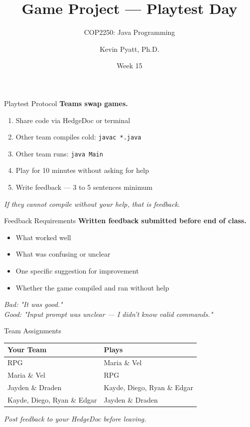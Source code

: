 \documentclass{beamer}
\title[Playtest Day]{Game Project --- Playtest Day}
\subtitle{COP2250: Java Programming}
\author{Kevin Pyatt, Ph.D.}
\institute{State College of Florida \\ Pyatt Labs}
\date{Week 15}
\begin{document}
\begin{frame}
  \titlepage
\end{frame}
\begin{frame}{Playtest Protocol}
\textbf{Teams swap games.}
\vspace{0.3cm}
\begin{enumerate}
  \item Share code via HedgeDoc or terminal
  \item Other team compiles cold: \texttt{javac *.java}
  \item Other team runs: \texttt{java Main}
  \item Play for 10 minutes without asking for help
  \item Write feedback --- 3 to 5 sentences minimum
\end{enumerate}
\vspace{0.3cm}
\textit{If they cannot compile without your help, that is feedback.}
\end{frame}
\begin{frame}{Feedback Requirements}
\textbf{Written feedback submitted before end of class.}
\vspace{0.3cm}
\begin{itemize}
  \item What worked well
  \item What was confusing or unclear
  \item One specific suggestion for improvement
  \item Whether the game compiled and ran without help
\end{itemize}
\vspace{0.3cm}
\textit{Bad: "It was good."}\\
\textit{Good: "Input prompt was unclear --- I didn't know valid commands."}
\end{frame}
\begin{frame}{Team Assignments}
\begin{tabular}{ll}
\toprule
\textbf{Your Team} & \textbf{Plays} \\
\midrule
RPG & Maria \& Vel \\
Maria \& Vel & RPG \\
Jayden \& Draden & Kayde, Diego, Ryan \& Edgar \\
Kayde, Diego, Ryan \& Edgar & Jayden \& Draden \\
\bottomrule
\end{tabular}
\vspace{0.3cm}
\textit{Post feedback to your HedgeDoc before leaving.}
\end{frame}
\end{document}
